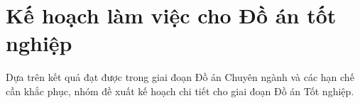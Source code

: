 \section{Kế hoạch làm việc cho Đồ án tốt nghiệp}

Dựa trên kết quả đạt được trong giai đoạn Đồ án Chuyên ngành và các hạn chế cần khắc phục, nhóm đề xuất kế hoạch chi tiết cho giai đoạn Đồ án Tốt nghiệp.






